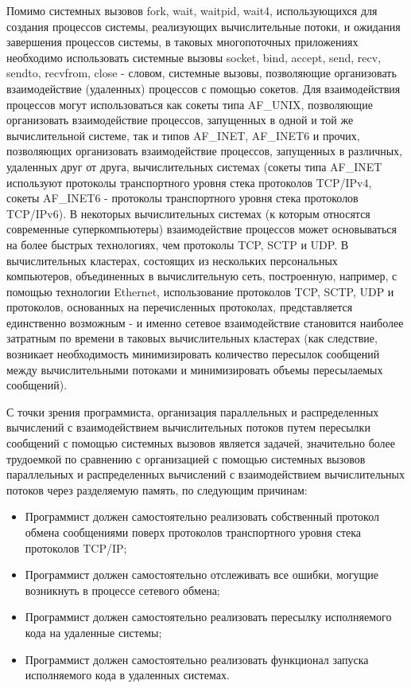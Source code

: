 Помимо системных вызовов fork, wait, waitpid, wait4, использующихся для создания процессов системы, реализующих вычислительные потоки, и ожидания завершения процессов системы, в таковых многопоточных приложениях необходимо использовать системные вызовы socket, bind, accept, send, recv, sendto, recvfrom, close - словом, системные вызовы, позволяющие организовать взаимодействие (удаленных) процессов с помощью сокетов. Для взаимодействия процессов могут использоваться как сокеты типа AF\_UNIX, позволяющие организовать взаимодействие процессов, запущенных в одной и той же вычислительной системе, так и типов AF\_INET, AF\_INET6 и прочих, позволяющих организовать взаимодействие процессов, запущенных в различных, удаленных друг от друга, вычислительных системах (сокеты типа AF\_INET используют протоколы транспортного уровня стека протоколов TCP/IPv4, сокеты AF\_INET6 - протоколы транспортного уровня стека протоколов TCP/IPv6). В некоторых вычислительных системах (к которым относятся современные суперкомпьютеры) взаимодействие процессов может основываться на более быстрых технологиях, чем протоколы TCP, SCTP и UDP. В вычислительных кластерах, состоящих из нескольких персональных компьютеров, объединенных в вычислительную сеть, построенную, например, с помощью технологии Ethernet, использование протоколов TCP, SCTP, UDP и протоколов, основанных на перечисленных протоколах, представляется единственно возможным - и именно сетевое взаимодействие становится наиболее затратным по времени в таковых вычислительных кластерах (как следствие, возникает необходимость минимизировать количество пересылок сообщений между вычислительными потоками и минимизировать объемы пересылаемых сообщений).

С точки зрения программиста, организация параллельных и распределенных вычислений с взаимодействием вычислительных потоков путем пересылки сообщений с помощью системных вызовов \gl является задачей, значительно более трудоемкой по сравнению с организацией с помощью системных вызовов \gl параллельных и распределенных вычислений с взаимодействием вычислительных потоков через разделяемую память, по следующим причинам:

\begin{itemize}

	\item Программист должен самостоятельно реализовать собственный протокол обмена сообщениями поверх протоколов транспортного уровня стека протоколов TCP/IP;
	\item Программист должен самостоятельно отслеживать все ошибки, могущие возникнуть в процессе сетевого обмена;
	\item Программист должен самостоятельно реализовать пересылку исполняемого кода на удаленные системы;
	\item Программист должен самостоятельно реализовать функционал запуска исполняемого кода в удаленных системах.

\end{itemize}

